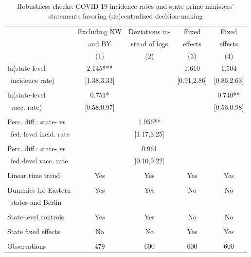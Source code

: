 \begin{table}[htbp]
\caption{Robustness checks: COVID-19 incidence rates and state prime ministers' statements favoring (de)centralized decision-making}
\begin{tabular}{lcccc}		\toprule
  & Excluding NW & Deviations in- & Fixed & Fixed \\
  & and BY       & stead of logs & effects & effects \\
  & (1) & (2) & (3) & (4) \\	\midrule
ln(state-level  & 2.145*** &  & 1.610 & 1.504  \\
\, incidence rate)  & [1.38,3.33] &  & [0.91,2.86] & [0.86,2.63]   \\
  & & & & 			\\
ln(state-level   & 0.751* &  & & 0.740**   \\
\, vacc. rate)  &   [0.58,0.97] & & & [0.56,0.98]   \\
  & & & &		\\
Perc. diff.: state- vs   &  & 1.956** &  &  \\
\, fed.-level incid. rate &  & [1.17,3.25] &  &  \\
  & & & &			\\
Perc. diff.: state- vs       &  & 0.961 &  &  \\
\, fed.-level vacc. rate	&  & [0.10,9.22]  &  &  \\
 & & & &		\\
Linear time trend & Yes & Yes & Yes & Yes \\
& & & & \\
Dummies for Eastern  & Yes & Yes & No & No \\
\, states and Berlin & & & & \\
 & & & & \\
State-level controls & Yes & Yes & No & No \\
 & & & & \\
State fixed effects & No & No & Yes & Yes \\
 & & & &		\\ \midrule
 Observations & 479 & 600 & 600 & 600 \\		\bottomrule
\end{tabular}		
\label{tb.reg02}
\begin{minipage}{\textwidth}

\end{minipage}
\end{table}
